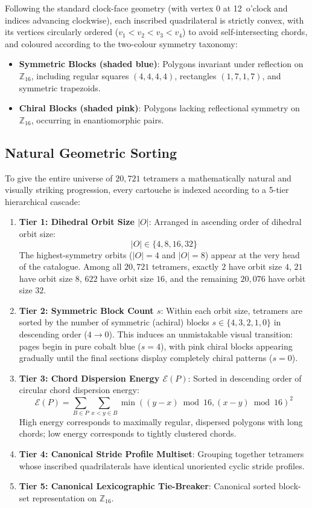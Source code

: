 Following the standard clock-face geometry (with vertex $0$ at 12~o'clock and indices advancing clockwise), each inscribed quadrilateral is strictly convex, with its vertices circularly ordered ($v_1 < v_2 < v_3 < v_4$) to avoid self-intersecting chords, and coloured according to the two-colour symmetry taxonomy:
\begin{itemize}
    \item \textbf{Symmetric Blocks (shaded blue)}: Polygons invariant under reflection on $\mathbb{Z}_{16}$, including regular squares $(4,4,4,4)$, rectangles $(1,7,1,7)$, and symmetric trapezoids.
    \item \textbf{Chiral Blocks (shaded pink)}: Polygons lacking reflectional symmetry on $\mathbb{Z}_{16}$, occurring in enantiomorphic pairs.
\end{itemize}

\subsection{Natural Geometric Sorting}

To give the entire universe of $20{,}721$ tetramers a mathematically natural and visually striking progression, every cartouche is indexed according to a 5-tier hierarchical cascade:
\begin{enumerate}
    \item \textbf{Tier 1: Dihedral Orbit Size $|O|$}:
    Arranged in ascending order of dihedral orbit size:
    \[
    |O| \in \{4, 8, 16, 32\}
    \]
    The highest-symmetry orbits ($|O| = 4$ and $|O| = 8$) appear at the very head of the catalogue. Among all $20{,}721$ tetramers, exactly $2$ have orbit size $4$, $21$ have orbit size $8$, $622$ have orbit size $16$, and the remaining $20{,}076$ have orbit size $32$.
    
    \item \textbf{Tier 2: Symmetric Block Count $s$}:
    Within each orbit size, tetramers are sorted by the number of symmetric (achiral) blocks $s \in \{4, 3, 2, 1, 0\}$ in descending order ($4 \to 0$). This induces an unmistakable visual transition: pages begin in pure cobalt blue ($s = 4$), with pink chiral blocks appearing gradually until the final sections display completely chiral patterns ($s = 0$).
    
    \item \textbf{Tier 3: Chord Dispersion Energy $\mathcal{E}(P)$}:
    Sorted in descending order of circular chord dispersion energy:
    \[
    \mathcal{E}(P) = \sum_{B \in P} \sum_{x < y \in B} \min((y - x) \bmod 16, (x - y) \bmod 16)^2
    \]
    High energy corresponds to maximally regular, dispersed polygons with long chords; low energy corresponds to tightly clustered chords.
    
    \item \textbf{Tier 4: Canonical Stride Profile Multiset}:
    Grouping together tetramers whose inscribed quadrilaterals have identical unoriented cyclic stride profiles.
    
    \item \textbf{Tier 5: Canonical Lexicographic Tie-Breaker}:
    Canonical sorted block-set representation on $\mathbb{Z}_{16}$.
\end{enumerate}

